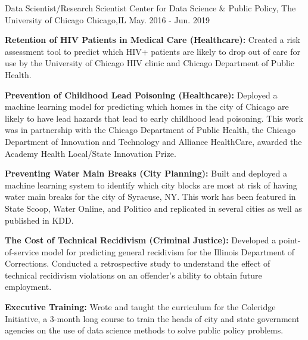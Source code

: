 \begin{cventries}
\Cventry
    {Data Scientist/Research Scientist} %
    {Center for Data Science \& Public Policy, The University of Chicago} %
    {Chicago,IL} %
    {May. 2016 - Jun. 2019} %
    {\begin{cvitems}
        \setlength\itemsep{.15em}
        \item { \textbf{Retention of HIV Patients in Medical Care (Healthcare): }Created a risk assessment tool to predict which HIV+ patients are likely to drop out of care for use by the University of Chicago HIV clinic and Chicago Department of Public Health.}
        \item { \textbf{Prevention of Childhood Lead Poisoning (Healthcare): }Deployed a machine learning model for predicting which homes in the city of Chicago are likely to have lead hazards that lead to early childhood lead poisoning. This work was in  partnership with the Chicago Department of Public Health, the Chicago Department of Innovation and Technology and Alliance HealthCare, awarded the Academy Health Local/State Innovation Prize.}
         \item { \textbf{Preventing Water Main Breaks (City Planning): }Built and deployed a machine learning system to identify which city blocks are most at risk of having water main breaks for the city of Syracuse, NY. This work has been featured in State Scoop, Water Online, and Politico and replicated in several cities as well as published in KDD.}
         \item { \textbf{The Cost of Technical Recidivism (Criminal Justice): }Developed a point-of-service model for predicting general recidivism for the Illinois Department of Corrections. Conducted a retrospective study to understand the effect of technical recidivism violations on an offender's ability to obtain future employment.}
         \item{ \textbf{Executive Training: }Wrote and taught the curriculum for the Coleridge Initiative, a 3-month long course to train the heads of city and state government agencies on the use of data science methods to solve public policy problems.}
     \end{cvitems}}




\end{cventries}
